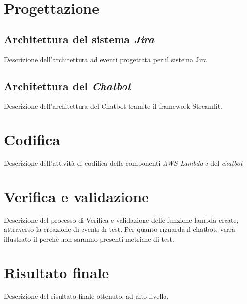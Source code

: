 \section{Progettazione}
\subsection{Architettura del sistema \textit{Jira}}
Descrizione dell'architettura ad eventi progettata per il sistema Jira
\subsection{Architettura del \textit{Chatbot}}
Descrizione dell'architettura del Chatbot tramite il framework Streamlit.
\section{Codifica}
Descrizione dell'attività di codifica delle componenti \textit{AWS Lambda} e del \textit{chatbot}
\section{Verifica e validazione}
Descrizione del processo di Verifica e validazione delle funzione lambda create, attraverso la creazione di eventi di test.
Per quanto riguarda il chatbot, verrà illustrato il perchè non saranno presenti metriche di test.

\section{Risultato finale}
Descrizione del risultato finale ottenuto, ad alto livello.